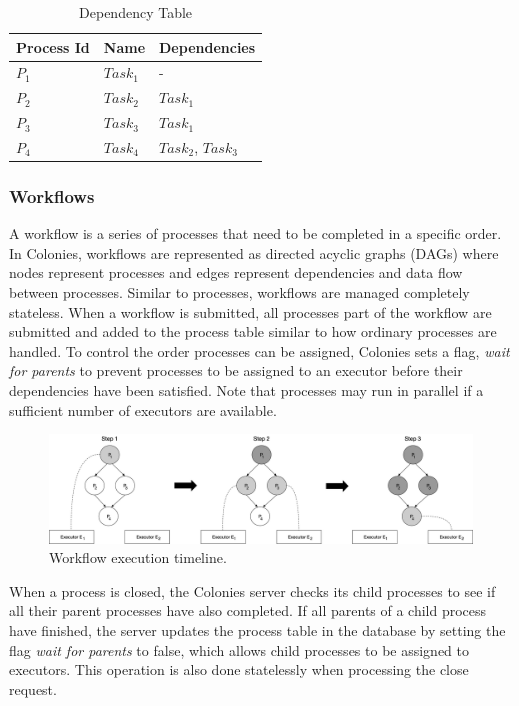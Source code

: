 \documentclass{article}
\begin{document}
\begin{table}[h]
	\caption{Dependency Table}
	\centering
	\begin{tabular}{lll}
		\toprule
		\cmidrule(r){1-2}
        Process Id & Name       & Dependencies           \\
		\midrule
        $P_{1}$    & $Task_{1}$ & -                      \\
        $P_{2}$    & $Task_{2}$ & $Task_{1}$             \\
        $P_{3}$    & $Task_{3}$ & $Task_{1}$             \\
        $P_{4}$    & $Task_{4}$ & $Task_{2}$, $Task_{3}$ \\
		\bottomrule
	\end{tabular}
	\label{deptable}
\end{table}

\subsubsection{Workflows}
A workflow is a series of processes that need to be completed in a specific order. In Colonies, workflows are represented as directed acyclic graphs (DAGs) where nodes represent processes and edges represent dependencies and data flow between processes. Similar to processes, workflows are managed completely stateless. When a workflow is submitted, all processes part of the workflow are submitted and added to the process table similar to how ordinary processes are handled. To control the order processes can be assigned, Colonies sets a flag, \emph{wait for parents} to prevent processes to be assigned to an executor before their dependencies have been satisfied. Note that processes may run in parallel if a sufficient number of executors are available.


\begin{figure}[h]
	\centering
    \includegraphics[scale=0.30]{workflow.png}
	\caption{Workflow execution timeline.}
	\label{fig:workflowexec}
\end{figure}

When a process is closed, the Colonies server checks its child processes to see if all their parent processes have also completed. If all parents of a child process have finished, the server updates the process table in the database by setting the flag \emph{wait for parents} to false, which allows child processes to be assigned to executors. This operation is also done statelessly when processing the close request. 
\end{document}
